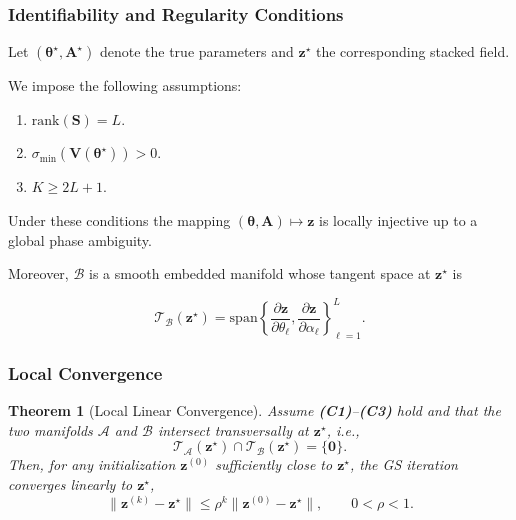 \documentclass[journal]{IEEEtran}
\newtheorem{theorem}{Theorem}
\begin{document}
\subsubsection{Identifiability and Regularity Conditions}

Let $(\boldsymbol\theta^\star,\mathbf A^\star)$ denote the true parameters and
$\mathbf z^\star$ the corresponding stacked field.

We impose the following assumptions:

\begin{enumerate}
\item[\textbf{(C1)}] $\mathrm{rank}(\mathbf S)=L$.
\item[\textbf{(C2)}] $\sigma_{\min}(\mathbf V(\boldsymbol\theta^\star))>0$.
\item[\textbf{(C3)}] $K\ge 2L+1$.
\end{enumerate}

Under these conditions the mapping
$(\boldsymbol\theta,\mathbf A)\mapsto \mathbf z$ is locally injective up to a
global phase ambiguity.

Moreover, $\mathcal B$ is a smooth embedded manifold whose tangent space at
$\mathbf z^\star$ is

\begin{equation}
\mathcal T_{\mathcal B}(\mathbf z^\star)
=
\mathrm{span}
\left\{
\frac{\partial \mathbf z}{\partial \theta_\ell},
\frac{\partial \mathbf z}{\partial \alpha_\ell}
\right\}_{\ell=1}^{L}.
\end{equation}

\subsubsection{Local Convergence}

\begin{theorem}[Local Linear Convergence]
Assume \textbf{(C1)}--\textbf{(C3)} hold and that the two manifolds $\mathcal A$ and
$\mathcal B$ intersect transversally at $\mathbf z^\star$, i.e.,
\begin{equation}
\mathcal T_{\mathcal A}(\mathbf z^\star)
\cap
\mathcal T_{\mathcal B}(\mathbf z^\star)
=
\{\mathbf 0\}.
\end{equation}
Then, for any initialization $\mathbf z^{(0)}$ sufficiently close to
$\mathbf z^\star$, the GS iteration converges linearly to $\mathbf z^\star$,
\begin{equation}
\|\mathbf z^{(k)}-\mathbf z^\star\|
\le
\rho^k
\|\mathbf z^{(0)}-\mathbf z^\star\|,
\qquad
0<\rho<1 .
\end{equation}
\end{theorem}
\end{document}
